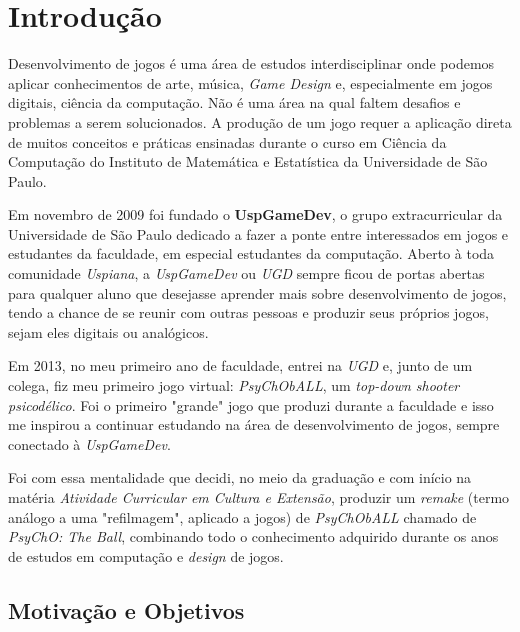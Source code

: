 \chapter{Introdução}
\label{cap:introducao}

  Desenvolvimento de jogos é uma área de estudos interdisciplinar onde podemos aplicar conhecimentos de arte, música, \textit{Game Design} e, especialmente em jogos digitais, ciência da computação. Não é uma área na qual faltem desafios e problemas a serem solucionados. A produção de um jogo requer a aplicação direta de muitos conceitos e práticas ensinadas durante o curso em Ciência da Computação do Instituto de Matemática e Estatística da Universidade de São Paulo.

  Em novembro de 2009 foi fundado o \textbf{UspGameDev}, o grupo extracurricular da Universidade de São Paulo dedicado a fazer a ponte entre interessados em jogos e estudantes da faculdade, em especial estudantes da computação. Aberto à toda comunidade \textit{Uspiana}, a \textit{UspGameDev} ou \textit{UGD} sempre ficou de portas abertas para qualquer aluno que desejasse aprender mais sobre desenvolvimento de jogos, tendo a chance de se reunir com outras pessoas e produzir seus próprios jogos, sejam eles digitais ou analógicos.

  Em 2013, no meu primeiro ano de faculdade, entrei na \textit{UGD} e, junto de um colega, fiz meu primeiro jogo virtual: \textit{PsyChObALL}, um \textit{top-down shooter psicodélico}. Foi o primeiro "grande" jogo que produzi durante a faculdade e isso me inspirou a continuar estudando na área de desenvolvimento de jogos, sempre conectado à \textit{UspGameDev}.

  Foi com essa mentalidade que decidi, no meio da graduação e com início na matéria \textit{Atividade Curricular em Cultura e Extensão}, produzir um \textit{remake} (termo análogo a uma "refilmagem", aplicado a jogos) de \textit{PsyChObALL} chamado de \textit{PsyChO: The Ball}, combinando todo o conhecimento adquirido durante os anos de estudos em computação e \textit{design} de jogos.


\section{Motivação e Objetivos}
\label{sec:motivacao_objetivo}

